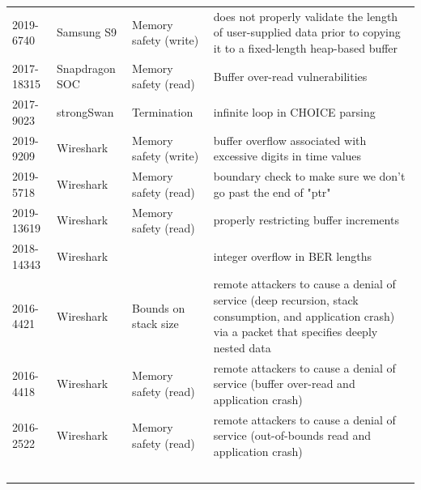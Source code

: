\documentclass[10p,conference]{IEEEtran}
\begin{document}
\begin{longtable}{ l l l p{26em} }
2019-6740    & Samsung S9    & Memory safety (write) & does not properly validate the length of user-supplied data prior to copying it to a fixed-length heap-based buffer \\ 
2017-18315   & Snapdragon SOC & Memory safety (read) & Buffer over-read vulnerabilities \\ 
2017-9023    & strongSwan    & Termination & infinite loop in CHOICE parsing \\ 
2019-9209    & Wireshark     & Memory safety (write) & buffer overflow associated with excessive digits in time values \\ 
2019-5718    & Wireshark     & Memory safety (read) & boundary check to make sure we don't go past the end of "ptr" \\ 
2019-13619   & Wireshark     & Memory safety (read) & properly restricting buffer increments \\ 
2018-14343   & Wireshark     &  & integer overflow in BER lengths \\ 
2016-4421    & Wireshark     & Bounds on stack size & remote attackers to cause a denial of service (deep recursion, stack consumption, and application crash) via a packet that specifies deeply nested data \\ 
2016-4418    & Wireshark     & Memory safety (read) & remote attackers to cause a denial of service (buffer over-read and application crash) \\ 
2016-2522    & Wireshark     & Memory safety (read) & remote attackers to cause a denial of service (out-of-bounds read and application crash) \\ 
​\end{longtable} 


\begin{multicols}{2}\end{multicols}
\end{document}
